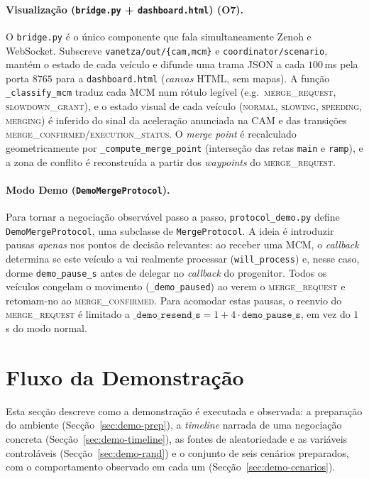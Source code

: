 \documentclass[11pt,a4paper]{article}
\begin{document}
\paragraph{Visualização (\texttt{bridge.py} + \texttt{dashboard.html}) (O7).} O
\texttt{bridge.py} é o único componente que fala simultaneamente Zenoh e WebSocket.
Subscreve \texttt{vanetza/out/\{cam,mcm\}} e \texttt{coordinator/scenario}, mantém o estado
de cada veículo e difunde uma trama JSON a cada $100$\,ms pela porta $8765$ para a
\texttt{dashboard.html} (\emph{canvas} HTML, sem mapas). A função \texttt{\_classify\_mcm}
traduz cada MCM num rótulo legível (e.g.\ \textsc{merge\_request}, \textsc{slowdown\_grant}),
e o estado visual de cada veículo (\textsc{normal}, \textsc{slowing}, \textsc{speeding},
\textsc{merging}) é inferido do sinal da aceleração anunciada na CAM e das transições
\textsc{merge\_confirmed}/\textsc{execution\_status}. O \emph{merge point} é recalculado
geometricamente por \texttt{\_compute\_merge\_point} (interseção das retas \texttt{main} e
\texttt{ramp}), e a zona de conflito é reconstruída a partir dos \emph{waypoints} do
\textsc{merge\_request}.

\paragraph{Modo Demo (\texttt{DemoMergeProtocol}).} Para tornar a negociação observável
passo a passo, \texttt{protocol\_demo.py} define \texttt{DemoMergeProtocol}, uma subclasse
de \texttt{MergeProtocol}. A ideia é introduzir pausas \emph{apenas} nos pontos de decisão
relevantes: ao receber uma MCM, o \emph{callback} determina se este veículo a vai realmente
processar (\texttt{will\_process}) e, nesse caso, dorme \texttt{demo\_pause\_s} antes de
delegar no \emph{callback} do progenitor. Todos os veículos congelam o movimento 
(\texttt{\_demo\_paused}) ao verem o \textsc{merge\_request} e retomam-no ao 
\textsc{merge\_confirmed}. Para acomodar estas pausas, o reenvio do \textsc{merge\_request} 
é limitado a $\texttt{\_demo\_resend\_s}=1 + 4\cdot\texttt{demo\_pause\_s}$, em vez
do $1$\,s do modo normal.

\section{Fluxo da Demonstração}
\label{sec:demo}

Esta secção descreve como a demonstração é executada e observada: a preparação do
ambiente (Secção~\ref{sec:demo-prep}), a \emph{timeline} narrada de uma negociação
concreta (Secção~\ref{sec:demo-timeline}), as fontes de aleatoriedade e as variáveis
controláveis (Secção~\ref{sec:demo-rand}) e o conjunto de seis cenários preparados,
com o comportamento observado em cada um (Secção~\ref{sec:demo-cenarios}).
\end{document}
